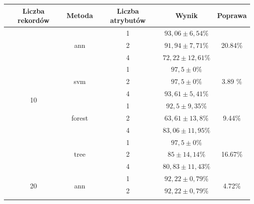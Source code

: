 \begin{table}[]
\tiny
\centering
\begin{tabular}{|c|c|c|c|c|}
\hline
Liczba rekordów       & Metoda                  & Liczba atrybutów & Wynik & Poprawa \\ \hline
\multirow{12}{*}{10}  & \multirow{3}{*}{ann}    & 1                & $ 93,06  \pm  6,54 \% $ & \multirow{3}{*}{20.84\%} \\ \cline{3-4} 
                      &                         & 2                & $ 91,94 \pm 7,71 \% $   & \\ \cline{3-4} 
                      &                         & 4                & $ 72,22 \pm 12,61 \% $  & \\ \cline{2-5} 
                      & \multirow{3}{*}{svm}    & 1                & $ 97,5 \pm 0 \% $        & \multirow{3}{*}{3.89 \%} \\ \cline{3-4} 
                      &                         & 2                & $ 97,5 \pm 0 \% $       &\\ \cline{3-4} 
                      &                         & 4                & $ 93,61 \pm 5,41 \% $   &\\ \cline{2-5} 
                      & \multirow{3}{*}{forest} & 1                & $ 92,5 \pm 9,35 \% $    & \multirow{3}{*}{9.44\%} \\ \cline{3-4} 
                      &                         & 2                & $ 63,61 \pm 13,8 \% $   &\\ \cline{3-4} 
                      &                         & 4                & $ 83,06 \pm 11,95 \% $ & \\ \cline{2-5} 
                      & \multirow{3}{*}{tree}   & 1                & $ 97,5 \pm 0 \% $       & \multirow{3}{*}{16.67\%} \\ \cline{3-4} 
                      &                         & 2                & $ 85 \pm  14,14 \% $    & \\ \cline{3-4} 
                      &                         & 4                & $ 80,83 \pm 11,43 \% $  &\\ \hline
\multirow{12}{*}{20}  & \multirow{3}{*}{ann}    & 1                & $ 92,22 \pm 0,79 \% $   & \multirow{3}{*}{4.72\%} \\ \cline{3-4} 
                      &                         & 2                & $ 92,22 \pm 0,79 \% $   &\\ \cline{3-4} 

\end{tabular}
\end{table}
